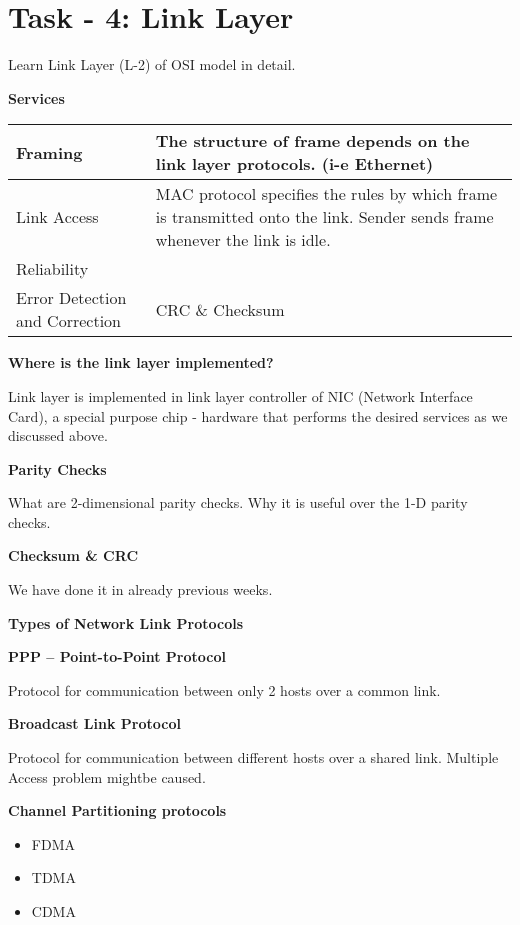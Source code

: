 \documentclass[letterpaper,10pt,english]{sphinxmanual}
\begin{document}
\section{Task - 4: Link Layer}
\label{week-05:task-4-link-layer}
Learn Link Layer (L-2) of OSI model in detail.

\textbf{Services}

\begin{tabulary}{\linewidth}{|L|L|}
\hline

Framing
 & 
The structure of frame depends on the link layer protocols. (i-e Ethernet)
\\
\hline
Link Access
 & 
MAC protocol specifies the rules by which frame is transmitted onto the link. Sender sends frame whenever the link is idle.
\\
\hline
Reliability
 & \\
\hline
Error Detection and Correction
 & 
CRC \& Checksum
\\
\hline\end{tabulary}


\textbf{Where is the link layer implemented?}

Link layer is implemented in link layer controller of NIC (Network Interface Card), a special purpose chip - hardware that performs the desired services as we discussed above.

\textbf{Parity Checks}

What are 2-dimensional parity checks. Why it is useful over the 1-D parity checks.

\textbf{Checksum \& CRC}

We have done it in already previous weeks.

\textbf{Types of Network Link Protocols}

\textbf{PPP – Point-to-Point Protocol}

Protocol for communication between only 2 hosts over a common link.

\textbf{Broadcast Link Protocol}

Protocol for communication between different hosts over a shared link. Multiple Access problem mightbe caused.

\textbf{Channel Partitioning protocols}
\begin{itemize}
\item {} 
FDMA

\item {} 
TDMA

\item {} 
CDMA

\end{itemize}
\end{document}
